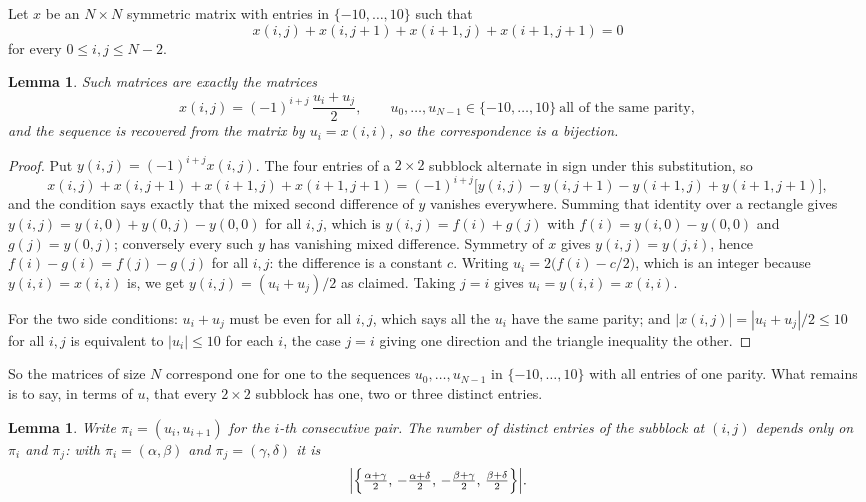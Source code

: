 \documentclass[11pt,a4paper]{article}
\theoremstyle{plain}
\newtheorem{lemma}[theorem]{Lemma}
\theoremstyle{definition}
\begin{document}
Let $x$ be an $N\times N$ symmetric matrix with entries in $\{-10,\dots,10\}$ such that
\[
x(i,j)+x(i,j{+}1)+x(i{+}1,j)+x(i{+}1,j{+}1)=0
\]
for every $0\le i,j\le N-2$.

\begin{lemma}\label{lem:solve}
Such matrices are exactly the matrices
\[
x(i,j)=(-1)^{i+j}\,\frac{u_i+u_j}{2},
\qquad u_0,\dots,u_{N-1}\in\{-10,\dots,10\}\ \text{all of the same parity},
\]
and the sequence is recovered from the matrix by $u_i=x(i,i)$, so the correspondence is a
bijection.
\end{lemma}

\begin{proof}
Put $y(i,j)=(-1)^{i+j}x(i,j)$. The four entries of a $2\times2$ subblock alternate in sign
under this substitution, so
\[
x(i,j)+x(i,j{+}1)+x(i{+}1,j)+x(i{+}1,j{+}1)
=(-1)^{i+j}\bigl[y(i,j)-y(i,j{+}1)-y(i{+}1,j)+y(i{+}1,j{+}1)\bigr],
\]
and the condition says exactly that the mixed second difference of $y$ vanishes everywhere.
Summing that identity over a rectangle gives
$y(i,j)=y(i,0)+y(0,j)-y(0,0)$ for all $i,j$, which is $y(i,j)=f(i)+g(j)$ with
$f(i)=y(i,0)-y(0,0)$ and $g(j)=y(0,j)$; conversely every such $y$ has vanishing mixed
difference. Symmetry of $x$ gives $y(i,j)=y(j,i)$, hence $f(i)-g(i)=f(j)-g(j)$ for all $i,j$:
the difference is a constant $c$. Writing $u_i=2\bigl(f(i)-c/2\bigr)$, which is an integer
because $y(i,i)=x(i,i)$ is, we get $y(i,j)=(u_i+u_j)/2$ as claimed. Taking $j=i$ gives
$u_i=y(i,i)=x(i,i)$.

For the two side conditions: $u_i+u_j$ must be even for all $i,j$, which says all the $u_i$ have
the same parity; and $|x(i,j)|=|u_i+u_j|/2\le10$ for all $i,j$ is equivalent to $|u_i|\le10$
for each $i$, the case $j=i$ giving one direction and the triangle inequality the other.
\end{proof}

So the matrices of size $N$ correspond one for one to the sequences $u_0,\dots,u_{N-1}$ in
$\{-10,\dots,10\}$ with all entries of one parity. What remains is to say, in terms of $u$,
that every $2\times2$ subblock has one, two or three distinct entries.

\begin{lemma}\label{lem:block}
Write $\pi_i=(u_i,u_{i+1})$ for the $i$-th consecutive pair. The number of distinct entries of
the subblock at $(i,j)$ depends only on $\pi_i$ and $\pi_j$: with $\pi_i=(\alpha,\beta)$ and
$\pi_j=(\gamma,\delta)$ it is
\[
\Bigl|\Bigl\{\tfrac{\alpha+\gamma}{2},\,-\tfrac{\alpha+\delta}{2},\,
-\tfrac{\beta+\gamma}{2},\,\tfrac{\beta+\delta}{2}\Bigr\}\Bigr| .
\]
\end{lemma}
\end{document}
